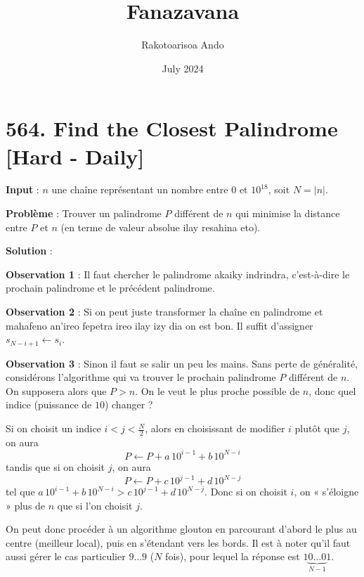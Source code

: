 \documentclass{article}
\title{Fanazavana}
\author{Rakotoarisoa Ando}
\date{July 2024}
\begin{document}
\maketitle

\section{564. Find the Closest Palindrome [Hard - Daily]}

\textbf{Input} : $n$ une chaîne représentant un nombre entre $0$ et $10^{18}$, soit $N = |n|$.

\textbf{Problème} : Trouver un palindrome $P$ différent de $n$ qui minimise la distance entre $P$ et $n$ (en terme de valeur absolue ilay resahina eto).

\textbf{Solution} :

\textbf{Observation 1} : Il faut chercher le palindrome akaiky indrindra, c'est-à-dire le prochain palindrome et le précédent palindrome.

\textbf{Observation 2} : Si on peut juste transformer la chaîne en palindrome et mahafeno an'ireo fepetra ireo ilay izy dia on est bon. Il suffit d'assigner $s_{N - i + 1} \leftarrow s_i$.

\textbf{Observation 3} : Sinon il faut se salir un peu les mains. Sans perte de généralité, considérons l'algorithme qui va trouver le prochain palindrome $P$ différent de $n$. On supposera alors que $P > n$. On le veut le plus proche possible de $n$, donc quel indice (puissance de $10$) changer ?

Si on choisit un indice $i < j < \frac{N}{2}$, alors en choisissant de modifier $i$ plutôt que $j$, on aura
\[
P \leftarrow P + a\,10^{i - 1} + b\,10^{N - i}
\]
tandis que si on choisit $j$, on aura
\[
P \leftarrow P + c\,10^{j - 1} + d\,10^{N - j}
\]
tel que $a\,10^{i - 1} + b\,10^{N - i} > c\,10^{j - 1} + d\,10^{N - j}$. Donc si on choisit $i$, on « s'éloigne » plus de $n$ que si l'on choisit $j$.

On peut donc procéder à un algorithme glouton en parcourant d'abord le plus au centre (meilleur local), puis en s'étendant vers les bords. Il est à noter qu'il faut aussi gérer le cas particulier $9\ldots9$ ($N$ fois), pour lequel la réponse est $1\underbrace{0\ldots0}_{N-1}1$.
\end{document}
